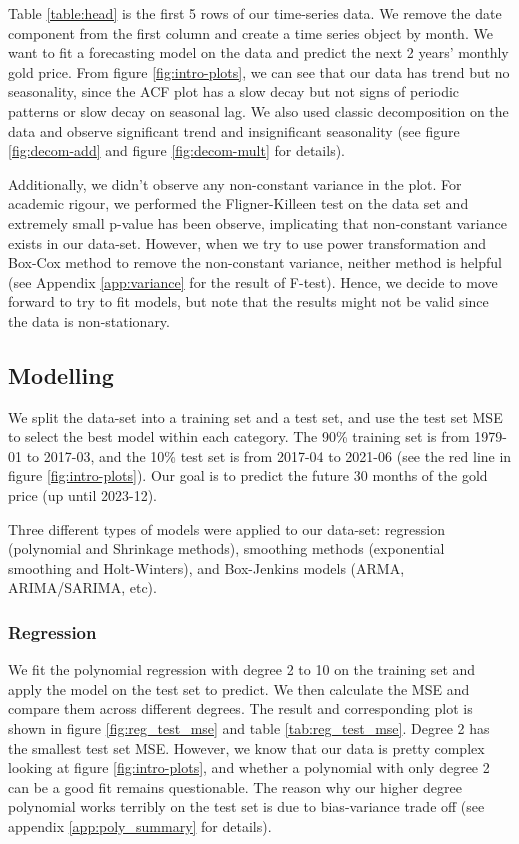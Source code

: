 \documentclass[paper=letter, fontsize=11pt]{scrartcl}
\begin{document}
Table \ref{table:head} is the first 5 rows of our time-series data. We remove the date component from the first column and create a time series object by month. We want to fit a forecasting model on the data and predict the next 2 years' monthly gold price. From figure \ref{fig:intro-plots}, we can see that our data has trend but no seasonality, since the ACF plot has a slow decay but not signs of periodic patterns or slow decay on seasonal lag. We also used classic decomposition on the data and observe significant trend and insignificant seasonality (see figure \ref{fig:decom-add} and figure \ref{fig:decom-mult} for details).

Additionally, we didn't observe any non-constant variance in the plot. For academic rigour, we performed the Fligner-Killeen test on the data set and extremely small p-value has been observe, implicating that non-constant variance exists in our data-set. However, when we try to use power transformation and Box-Cox method to remove the non-constant variance, neither method is helpful (see Appendix \ref{app:variance} for the result of F-test). 
Hence, we decide to move forward to try to fit models, but note that the results might not be valid since the data is non-stationary.


\subsection{Modelling}

We split the data-set into a training set and a test set, and use the test set MSE to select the best model within each category. 
The 90\% training set is from 1979-01 to 2017-03, and the 10\% test set is from 2017-04 to 2021-06 (see the red line in figure \ref{fig:intro-plots}).
Our goal is to predict the future 30 months of the gold price (up until 2023-12).

Three different types of models were applied to our data-set: regression (polynomial and Shrinkage methods), smoothing methods (exponential smoothing and Holt-Winters), and Box-Jenkins models (ARMA, ARIMA/SARIMA, etc).

\subsubsection{Regression}
\label{sec:regression}

We fit the polynomial regression with degree 2 to 10 on the training set and apply the model on the test set to predict. We then calculate the MSE and compare them across different degrees. The result and corresponding plot is shown in figure \ref{fig:reg_test_mse} and table \ref{tab:reg_test_mse}. 
Degree 2 has the smallest test set MSE. However, we know that our data is pretty complex looking at figure \ref{fig:intro-plots}, and whether a polynomial with only degree 2 can be a good fit remains questionable. The reason why our higher degree polynomial works terribly on the test set is due to bias-variance trade off (see appendix \ref{app:poly_summary} for details). 
\end{document}
